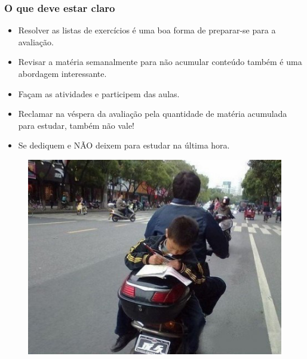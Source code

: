\documentclass{beamer}
\begin{document}
\begin{frame}
	\frametitle{O que deve estar claro}
	\fontsize{14pt}{7.2}\selectfont
	\begin{minipage}[t][\textheight][t]{\textwidth}
	\begin{itemize}
		\item Resolver as listas de exercícios é uma boa forma de preparar-se para a avaliação.
		\item Revisar a matéria semanalmente para não acumular conteúdo também é uma abordagem interessante.
		\item Façam as atividades e participem das aulas.
		\item Reclamar na véspera da avaliação pela quantidade de matéria acumulada para estudar, também não vale!
		\item Se dediquem e NÃO deixem para estudar na última hora.
	\end{itemize}
	\begin{figure}[htbp]
		\includegraphics[scale=0.2]{figures/estudando-na-moto.jpg}
	\end{figure}
	\end{minipage}
\end{frame}
\end{document}
